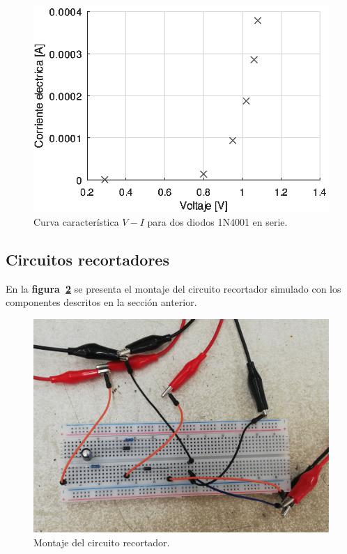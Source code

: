 \documentclass[letter,twoside,11pt]{article}
\begin{document}
\begin{figure}[!h]
\centering
\includegraphics[scale=0.75]{graficas/o1.eps}
\caption{Curva característica $V-I$ para dos diodos 1N4001 en serie.}
\label{grafica}
\end{figure}

\subsection{Circuitos recortadores}
En la \textbf{figura~\ref{labo1}} se presenta el montaje del circuito
recortador simulado con los componentes descritos en la sección anterior.

\begin{figure}[!h]
\centering
\includegraphics[scale=0.10]{fotos/labo1.1.eps}
\caption{Montaje del circuito recortador.}
\label{labo1}
\end{figure}
\end{document}
